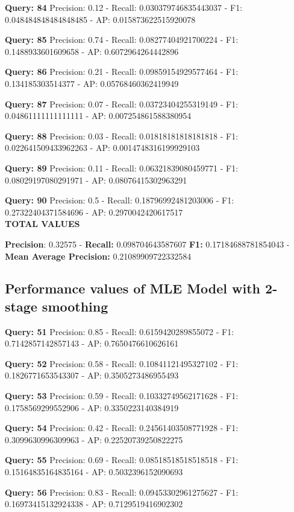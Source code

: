 \documentclass[a4paper, 11pt]{article}
\begin{document}
\textbf{Query: 84}
Precision: 0.12 - Recall: 0.030379746835443037 - F1: 0.048484848484848485 - AP:  0.015873622515920078

\textbf{Query: 85}
Precision: 0.74 - Recall: 0.08277404921700224 - F1: 0.1488933601609658 - AP: 0.6072964264442896

\textbf{Query: 86}
Precision: 0.21 - Recall: 0.09859154929577464 - F1: 0.134185303514377 - AP:  0.05768460362419949

\textbf{Query: 87}
Precision: 0.07 - Recall: 0.03723404255319149 - F1: 0.04861111111111111 - AP:  0.007254861588380954

\textbf{Query: 88}
Precision: 0.03 - Recall: 0.01818181818181818 - F1: 0.022641509433962263 - AP:  0.0014748316199929103

\textbf{Query: 89}
Precision: 0.11 - Recall: 0.06321839080459771 - F1: 0.08029197080291971 - AP:  0.08076415302963291

\textbf{Query: 90}
Precision: 0.5 - Recall: 0.18796992481203006 - F1: 0.27322404371584696 - AP:  0.2970042420617517\\

\textbf{TOTAL VALUES}

\textbf{Precision}: 0.32575 - \textbf{Recall:} 0.098704643587607 \textbf{F1:} 0.17184688781854043 -\textbf{Mean Average Precision:} 0.21089909722332584

\subsection{Performance values of MLE Model with 2-stage smoothing}

\textbf{Query: 51}
Precision: 0.85 - Recall: 0.6159420289855072 - F1: 0.7142857142857143 - AP:  0.7650476610626161

\textbf{Query: 52}
Precision: 0.58 - Recall: 0.10841121495327102 - F1: 0.1826771653543307 - AP:  0.3505273486955493

\textbf{Query: 53}
Precision: 0.59 - Recall: 0.10332749562171628 - F1: 0.1758569299552906 - AP:  0.3350223140384919

\textbf{Query: 54}
Precision: 0.42 - Recall: 0.24561403508771928 - F1: 0.3099630996309963 - AP:  0.22520739250822275

\textbf{Query: 55}
Precision: 0.69 - Recall: 0.08518518518518518 - F1: 0.15164835164835164 - AP:  0.5032396152090693

\textbf{Query: 56}
Precision: 0.83 - Recall: 0.09453302961275627 - F1: 0.16973415132924338 - AP:  0.7129519416902302
\end{document}
